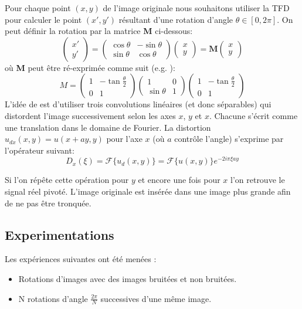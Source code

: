 Pour chaque point $(x, y)$ de l'image originale nous souhaitons utiliser la TFD pour calculer le point $(x', y')$ résultant d'une rotation d'angle  $\theta \in {[0, 2\pi]}$. On peut définir la rotation par la matrice \textbf{M} ci-dessous:
$$\begin{pmatrix}
x' \\ y'
\end{pmatrix}=
\begin{pmatrix}
\cos \theta & -\sin \theta \\
\sin \theta & \cos \theta
\end{pmatrix}
\begin{pmatrix}
x \\ y
\end{pmatrix}=\textbf{M}
\begin{pmatrix}
x \\ y
\end{pmatrix}
$$
où \textbf{M} peut être ré-exprimée comme suit (e.g. \cite{paeth86}):
$$M =
\begin{pmatrix}
1 & -\tan \frac{\theta}{2} \\
0 & 1
\end{pmatrix}
\begin{pmatrix}
1 & 0 \\
\sin \theta & 1
\end{pmatrix}
\begin{pmatrix}
1 & -\tan \frac{\theta }{2}\\
0 & 1
\end{pmatrix}
$$
L'idée de \cite{unser95} \cite{larkin97} est d'utiliser trois convolutions linéaires (et donc séparables) qui distordent l'image successivement selon les axes $x$, $y$ et $x$. 
Chacune s'écrit comme une translation dans le domaine de Fourier. La distortion $u_{dx}(x, y) = u(x + ay, y)$ pour l'axe $x$ (où $a$ contrôle l'angle) s'exprime par l'opérateur suivant:
$$ D_x(\xi) = \mathcal{F}\{u_d(x, y)\} = \mathcal{F}\{u(x, y)\} e^{-2 i \pi \xi a y}$$


Si l'on répête cette opération pour $y$ et encore une fois pour $x$ l'on retrouve le signal réel pivoté. L'image originale est insérée dans une image plus grande afin de ne pas être tronquée. \newline

\subsection{Experimentations}

Les expériences suivantes ont été menées : 
\begin{itemize}
\item Rotations d'images avec des images bruitées et non bruitées.
\item N rotations d'angle $\frac{2\pi}{N}$ successives d'une même image. 
\end{itemize}

